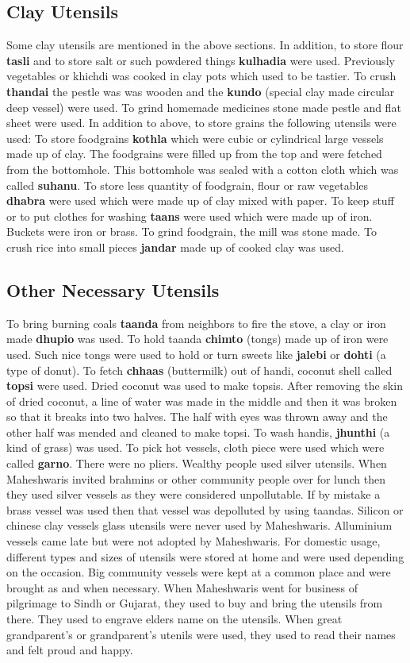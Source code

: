 \subsection{Clay Utensils}
Some clay utensils are mentioned in the above sections. In addition, to store
flour \textbf{tasli} and to store salt or such powdered things \textbf{kulhadia}
were used.
Previously vegetables or khichdi was cooked in clay pots which used to be
tastier.
To crush \textbf{thandai} the pestle was was wooden and the
\textbf{kundo} (special clay made circular deep vessel) were used.
To grind homemade medicines stone made pestle and flat sheet were used.
In addition to above, to store grains the following utensils were used:
To store foodgrains \textbf{kothla} which were cubic or cylindrical large
vessels made up of clay. The foodgrains were filled up from the top and were
fetched from the bottomhole. This bottomhole was sealed with a cotton cloth
which was called \textbf{suhanu}.
To store less quantity of foodgrain, flour or raw vegetables \textbf{dhabra}
were used which were made up of clay mixed with paper.
To keep stuff or to put clothes for washing \textbf{taans} were used which were
made up of iron.
Buckets were iron or brass.
To grind foodgrain, the mill was stone made.
To crush rice into small pieces \textbf{jandar} made up of cooked clay was used.
\subsection{Other Necessary Utensils}
To bring burning coals \textbf{taanda} from neighbors to fire the stove, a clay or iron made
\textbf{dhupio} was used.
To hold taanda \textbf{chimto} (tongs) made up of iron were used. Such nice
tongs were used to hold or turn sweets like \textbf{jalebi} or \textbf{dohti} (a type of
donut).
To fetch \textbf{chhaas} (buttermilk) out of handi, coconut shell called
\textbf{topsi} were used. Dried coconut was used to make topsis. After removing
the skin of dried coconut, a line of water was made in the middle and then it
was broken so that it breaks into two halves. The half with eyes was thrown away
and the other half was mended and cleaned to make topsi.
To wash handis, \textbf{jhunthi} (a kind of grass) was used.
To pick hot vessels, cloth piece were used which were called \textbf{garno}.
There were no pliers. Wealthy people used silver utensils. When Maheshwaris
invited brahmins or other community people over for lunch then they used silver
vessels as they were considered unpollutable. If by mistake a brass vessel was
used then that vessel was depolluted by using taandas.
Silicon or chinese clay vessels glass utensils were never used by Maheshwaris.
Alluminium vessels came late but were not adopted by Maheshwaris. For domestic
usage, different types and sizes of utensils were stored at home and were used
depending on the occasion. Big community vessels were kept at a common place and
were brought as and when necessary.
When Maheshwaris went for business of pilgrimage to Sindh or Gujarat, they used
to buy and bring the utensils from there. They used to engrave elders name on
the utensils. When great grandparent's or grandparent's utenils were used, they
used to read their names and felt proud and happy.


